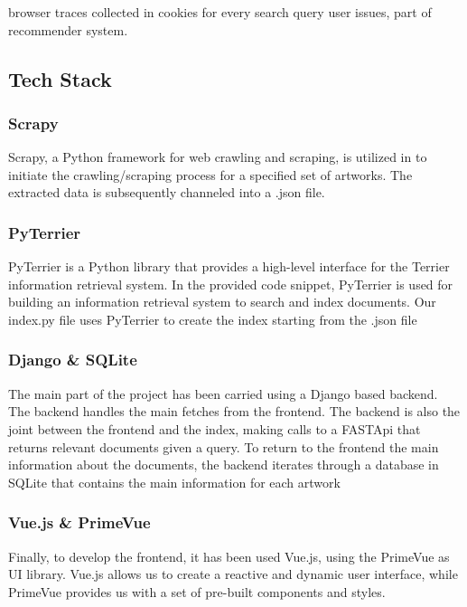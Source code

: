 \documentclass[12pt]{spieman}  %
\begin{document}
\begin{spacing}{1}
    browser traces collected in cookies for every search query user issues, part of recommender system.

    \subsection{Tech Stack}

    \subsubsection{Scrapy}
    Scrapy, a Python framework for web crawling and scraping, is utilized in to initiate the crawling/scraping process for a specified set of artworks. The extracted data is subsequently channeled into a .json file.

    \subsubsection{PyTerrier}
    PyTerrier is a Python library that provides a high-level interface for the Terrier information retrieval system. In the provided code snippet, PyTerrier is used for building an information retrieval system to search and index documents.\newline
    Our index.py file uses PyTerrier to create the index starting from the .json file

    \subsubsection{Django \& SQLite}
    The main part of the project has been carried using a Django based backend. The backend handles the main fetches from the frontend.
    The backend is also the joint between the frontend and the index, making calls to a FASTApi that returns relevant documents given a query.\newline
    To return to the frontend the main information about the documents, the backend iterates through a database in SQLite that contains the main information for each artwork

    \subsubsection{Vue.js \& PrimeVue}
    Finally, to develop the frontend, it has been used Vue.js, using the PrimeVue as UI library. Vue.js allows us to create a reactive and dynamic user interface, while PrimeVue provides us with a set of pre-built components and styles.


\end{spacing}
\end{document}
